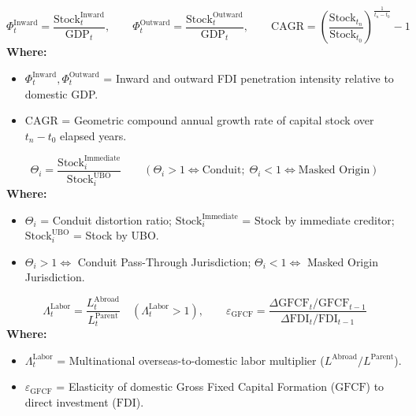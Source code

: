 \begin{formulabox}
\footnotesize
\begin{equation}
    \Phi_t^{\text{Inward}} = \frac{\text{Stock}_t^{\text{Inward}}}{\text{GDP}_t}, \qquad \Phi_t^{\text{Outward}} = \frac{\text{Stock}_t^{\text{Outward}}}{\text{GDP}_t}, \qquad \text{CAGR} = \left( \frac{\text{Stock}_{t_n}}{\text{Stock}_{t_0}} \right)^{\frac{1}{t_n - t_0}} - 1
\end{equation}
\textbf{Where:}
\begin{itemize}[leftmargin=1.2em, itemsep=1pt]
    \item $\Phi_t^{\text{Inward}}, \Phi_t^{\text{Outward}}$ = Inward and outward FDI penetration intensity relative to domestic GDP.
    \item $\text{CAGR}$ = Geometric compound annual growth rate of capital stock over $t_n - t_0$ elapsed years.
\end{itemize}
\end{formulabox}

\begin{formulabox}
\footnotesize
\begin{equation}
    \Theta_i = \frac{\text{Stock}_{i}^{\text{Immediate}}}{\text{Stock}_{i}^{\text{UBO}}} \qquad (\Theta_i > 1 \iff \text{Conduit}; \; \Theta_i < 1 \iff \text{Masked Origin})
\end{equation}
\textbf{Where:}
\begin{itemize}[leftmargin=1.2em, itemsep=1pt]
    \item $\Theta_i$ = Conduit distortion ratio; $\text{Stock}_{i}^{\text{Immediate}}$ = Stock by immediate creditor; $\text{Stock}_{i}^{\text{UBO}}$ = Stock by UBO.
    \item $\Theta_i > 1 \iff$ Conduit Pass-Through Jurisdiction; $\Theta_i < 1 \iff$ Masked Origin Jurisdiction.
\end{itemize}
\end{formulabox}

\begin{formulabox}
\footnotesize
\begin{equation}
    \Lambda_t^{\text{Labor}} = \frac{L_t^{\text{Abroad}}}{L_t^{\text{Parent}}} \quad (\Lambda_t^{\text{Labor}} > 1), \qquad \varepsilon_{\text{GFCF}} = \frac{\Delta \text{GFCF}_t / \text{GFCF}_{t-1}}{\Delta \text{FDI}_t / \text{FDI}_{t-1}}
\end{equation}
\textbf{Where:}
\begin{itemize}[leftmargin=1.2em, itemsep=1pt]
    \item $\Lambda_t^{\text{Labor}}$ = Multinational overseas-to-domestic labor multiplier ($L^{\text{Abroad}} / L^{\text{Parent}}$).
    \item $\varepsilon_{\text{GFCF}}$ = Elasticity of domestic Gross Fixed Capital Formation ($\text{GFCF}$) to direct investment ($\text{FDI}$).
\end{itemize}
\end{formulabox}

